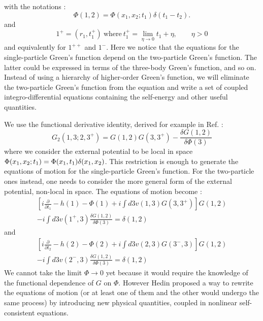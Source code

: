 with the notations : 
\begin{equation}
	\Phi(1,2) = \Phi(x_1,x_2;t_1) \delta(t_1-t_2).
\end{equation}
and 
\begin{equation}
	1^+ = (r_1,t_1^+) \ \text{where} \ t_1^+ = \lim_{\eta \to 0} t_1 + \eta, \qquad \eta > 0
\end{equation}
and equivalently for $1^{++}$ and $1^-$.
Here we notice that the equations for the single-particle Green's function depend on the two-particle Green's function. The latter could be expressed in terms of the three-body Green's function, and so on. Instead of using a hierarchy of higher-order Green's function, we will eliminate the two-particle Green's function from the equation and write a set of coupled integro-differential equations containing the self-energy and other useful quantities.
%

We use the functional derivative identity, derived for example in Ref. \cite{strinati1988application} :
\begin{equation}
	G_2(1,3;2,3^+) = G(1,2)G(3,3^+) - \frac{\delta G(1,2)}{\delta \Phi(3)} \label{eq:2GF_dPhi}
\end{equation}
where we consider the external potential to be local in space $\Phi(x_1,x_2;t_1) \\ = \Phi(x_1,t_1)\delta(x_1,x_2)$. This restriction is enough to generate the equations of motion for the single-particle Green's function. For the two-particle ones instead, one needs to consider the more general form of the external potential, non-local in space.
The equations of motion become :
\begin{multline}
	\left[ i \frac{\partial}{\partial t_1} - h(1) - \Phi(1) + i \int d3 v(1,3)G(3,3^+) \right] G(1,2) \\ 
	- i \int d3 v(1^+,3) \frac{\delta G(1,2)}{\delta \Phi(3)} = \delta(1,2)
\end{multline}
and
\begin{multline}
	\left[ i \frac{\partial}{\partial t_2} - h(2) - \Phi(2) + i \int d3 v(2,3)G(3^-,3) \right] G(1,2) \\
	- i \int d3 v(2^-,3) \frac{\delta G(1,2)}{\delta \Phi(3)} = \delta(1,2)
\end{multline}
We cannot take the limit $\Phi \to 0$ yet because it would require the knowledge of the functional dependence of $G$ on $\Phi$. However Hedin proposed a way to rewrite the equations of motion (or at least one of them and the other would undergo the same process) by introducing new physical quantities, coupled in nonlinear self-consistent equations.\cite{hedin1965new} 
%

